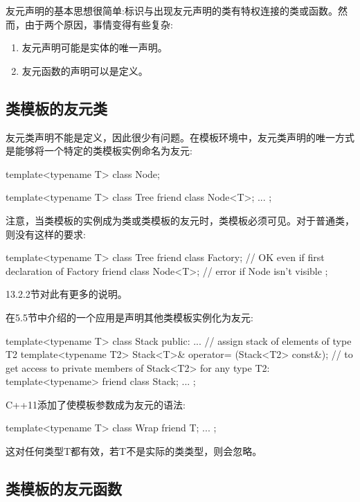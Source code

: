 
友元声明的基本思想很简单:标识与出现友元声明的类有特权连接的类或函数。然而，由于两个原因，事情变得有些复杂:

\begin{enumerate}
\item 
友元声明可能是实体的唯一声明。

\item 
友元函数的声明可以是定义。
\end{enumerate}

\subsection{类模板的友元类}

友元类声明不能是定义，因此很少有问题。在模板环境中，友元类声明的唯一方式是能够将一个特定的类模板实例命名为友元:

\begin{cpp}
template<typename T>
class Node;

template<typename T>
class Tree {
	friend class Node<T>;
	...
};
\end{cpp}

注意，当类模板的实例成为类或类模板的友元时，类模板必须可见。对于普通类，则没有这样的要求:

\begin{cpp}
template<typename T>
class Tree {
	friend class Factory; // OK even if first declaration of Factory
	friend class Node<T>; // error if Node isn’t visible
};
\end{cpp}

13.2.2节对此有更多的说明。

在5.5节中介绍的一个应用是声明其他类模板实例化为友元:

\begin{cpp}
template<typename T>
class Stack {
	public:
	...
	// assign stack of elements of type T2
	template<typename T2>
	Stack<T>& operator= (Stack<T2> const&);
	// to get access to private members of Stack<T2> for any type T2:
	template<typename> friend class Stack;
	...
};
\end{cpp}

C++11添加了使模板参数成为友元的语法:

\begin{cpp}
template<typename T>
class Wrap {
	friend T;
	...
};
\end{cpp}

这对任何类型T都有效，若T不是实际的类类型，则会忽略。

\subsection{类模板的友元函数}

